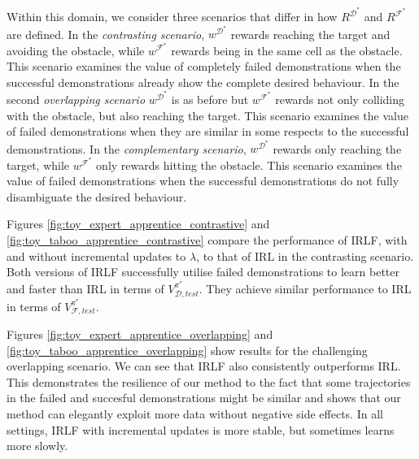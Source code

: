 \documentclass{aamas2016}
\newcommand{\jm}[1]{\textcolor{blue}{Joao: #1}}
\newcommand{\ks}[1]{\textcolor{dark_green}{Kyriacos: #1}}
\newcommand{\jm}[1]{}
\newcommand{\ks}[1]{}
\begin{document}

Within this domain, we consider three scenarios that differ in how $R^{\mathcal{D}^*}$ and $R^{\mathcal{F}^*}$ are defined.  In the \emph{contrasting scenario}, $w^{\mathcal{D}^*}$ rewards reaching the target and avoiding the obstacle, while $w^{\mathcal{F}^*}$ rewards being in the same cell as the obstacle.  This scenario examines the value of completely failed demonstrations when the successful demonstrations already show the complete desired behaviour. In the second \emph{overlapping scenario} $w^{\mathcal{D}^*}$ is as before but $w^{\mathcal{F}^*}$ rewards not only colliding with the obstacle, but also reaching the target. This scenario examines the value of failed demonstrations when they are similar in some respects to the successful demonstrations. In the \emph{complementary scenario}, $w^{\mathcal{D}^*}$ rewards only reaching the target, while $w^{\mathcal{F}^*}$ only rewards hitting the obstacle. This scenario examines the value of failed demonstrations when the successful demonstrations do not fully disambiguate the desired behaviour.

Figures \ref{fig:toy_expert_apprentice_contrastive} and \ref{fig:toy_taboo_apprentice_contrastive} compare the performance of IRLF, with and without incremental updates to $\lambda$, to that of IRL in the contrasting scenario. Both versions of IRLF successfully utilise failed demonstrations to learn better and faster than IRL in terms of $V^{\pi^*}_{\mathcal{D},test}$.  They achieve similar performance to IRL in terms of $V^{\pi^*}_{\mathcal{F},test}$.  

Figures \ref{fig:toy_expert_apprentice_overlapping} and \ref{fig:toy_taboo_apprentice_overlapping} show results for the challenging overlapping scenario. We can see that IRLF also consistently outperforms IRL. This demonstrates the resilience of our method to the fact that some trajectories in the failed and succesful demonstrations might be similar and shows that our method can elegantly exploit more data without negative side effects. In all settings, IRLF with incremental updates is more stable, but sometimes learns more slowly.
\end{document}
